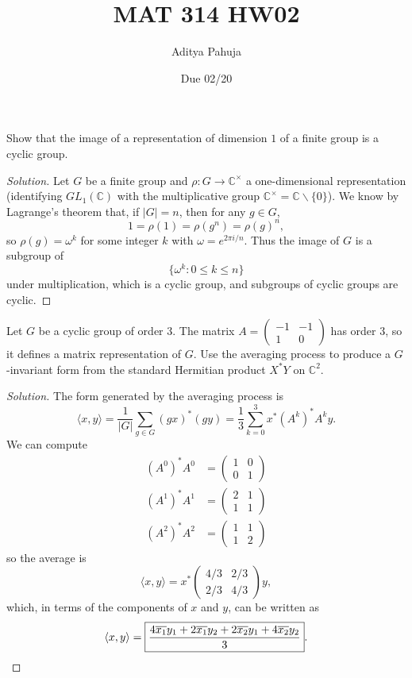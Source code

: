\documentclass[10pt]{scrartcl}
\title{\vspace{-2em}MAT 314 HW02}
\author{\large Aditya Pahuja}
\date{\large Due 02/20}
\providecommand{\ol}{\overline}
\providecommand{\CC}{\mathbb C}
\providecommand{\setdiff}{\smallsetminus}
\newenvironment{soln}{\begin{proof}[Solution]}{\end{proof}}
\begin{document}
\maketitle

\begin{problem*}[1.1]
	Show that the image of a representation of dimension $1$
	of a finite group is a cyclic group.
\end{problem*}

\begin{soln}
	Let $G$ be a finite group and $\rho\colon G\to \CC^\times$
	a one-dimensional representation (identifying $GL_1(\CC)$ with
	the multiplicative group $\CC^\times = \CC\setdiff\{0\}$).
	We know by Lagrange's theorem that, if $|G| = n$, then for any $g\in G$,
	\[1 = \rho(1) = \rho(g^n) = \rho(g)^n,\]
	so $\rho(g) = \omega^k$ for some integer $k$ with $\omega = e^{2\pi i/n}$. Thus the image of $G$ is a subgroup of
	\[\{\omega^k\colon 0\le k\le n\}\]
	under multiplication, which is a cyclic group,
	and subgroups of cyclic groups are cyclic.
\end{soln}

\begin{problem*}[3.1]
	Let $G$ be a cyclic group of order $3$.
	The matrix $A = \begin{pmatrix}
		-1&-1\\1&0
	\end{pmatrix}$ has order $3$, so it defines a matrix representation of $G$.
	Use the averaging process to produce a $G$-invariant form
	from the standard Hermitian product $X^*Y$ on $\CC^2$.
\end{problem*}

\begin{soln}
	The form generated by the averaging process is
	\[\langle x,y\rangle = \frac1{|G|}\sum_{g\in G} (gx)^*(gy)
	= \frac13\sum_{k=0}^3 x^*(A^k)^*A^ky.\]
	We can compute
	\begin{align*}
		(A^0)^*A^0 &= \begin{pmatrix}
			1&0\\0&1
		\end{pmatrix}\\
		(A^1)^*A^1 &= \begin{pmatrix}
			2&1\\1&1
		\end{pmatrix}\\
		(A^2)^*A^2 &= \begin{pmatrix}
			1&1\\1&2
		\end{pmatrix}
	\end{align*}
	so the average is
	\[\langle x,y\rangle = x^*\begin{pmatrix}
		4/3&2/3\\2/3&4/3
	\end{pmatrix}y,\]
	which, in terms of the components of $x$ and $y$, can be written as
	\[\langle x,y\rangle =
	\boxed{
		\frac{4\ol{x_1}y_1 + 2\ol{x_1}y_2 +2\ol{x_2}y_1 + 4\ol{x_2}y_2}{3}
	}.\qedhere\]
\end{soln}
\end{document}
